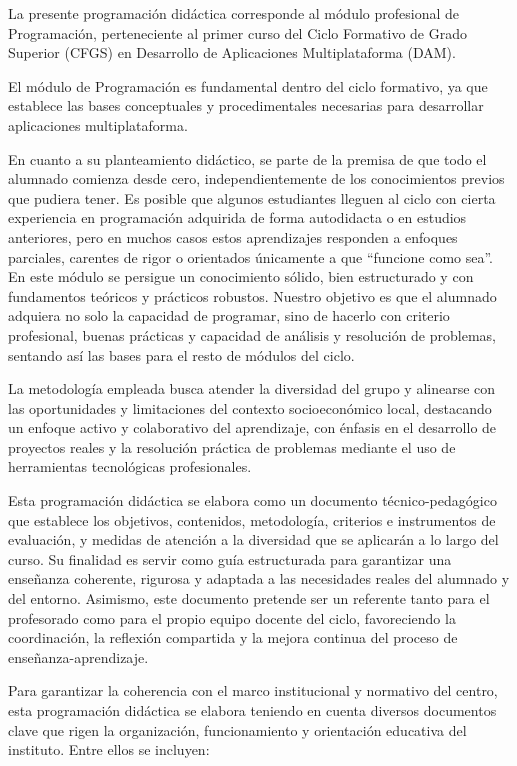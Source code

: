
La presente programación didáctica corresponde al módulo profesional de Programación, perteneciente al primer curso del Ciclo Formativo de Grado Superior (CFGS) en Desarrollo de Aplicaciones Multiplataforma (DAM).

El módulo de Programación es fundamental dentro del ciclo formativo, ya que establece las bases conceptuales y procedimentales necesarias para desarrollar aplicaciones multiplataforma. 

\label{sec:intro_00_conocimiento_previo}
En cuanto a su planteamiento didáctico, se parte de la premisa de que todo el alumnado comienza desde cero, independientemente de los conocimientos previos que pudiera tener. Es posible que algunos estudiantes lleguen al ciclo con cierta experiencia en programación adquirida de forma autodidacta o en estudios anteriores, pero en muchos casos estos aprendizajes responden a enfoques parciales, carentes de rigor o orientados únicamente a que “funcione como sea”. En este módulo se persigue un conocimiento sólido, bien estructurado y con fundamentos teóricos y prácticos robustos. Nuestro objetivo es que el alumnado adquiera no solo la capacidad de programar, sino de hacerlo con criterio profesional, buenas prácticas y capacidad de análisis y resolución de problemas, sentando así las bases para el resto de módulos del ciclo.

La metodología empleada busca atender la diversidad del grupo y alinearse con las oportunidades y limitaciones del contexto socioeconómico local, destacando un enfoque activo y colaborativo del aprendizaje, con énfasis en el desarrollo de proyectos reales y la resolución práctica de problemas mediante el uso de herramientas tecnológicas profesionales.

Esta programación didáctica se elabora como un documento técnico-pedagógico que establece los objetivos, contenidos, metodología, criterios e instrumentos de evaluación, y medidas de atención a la diversidad que se aplicarán a lo largo del curso. Su finalidad es servir como guía estructurada para garantizar una enseñanza coherente, rigurosa y adaptada a las necesidades reales del alumnado y del entorno. Asimismo, este documento pretende ser un referente tanto para el profesorado como para el propio equipo docente del ciclo, favoreciendo la coordinación, la reflexión compartida y la mejora continua del proceso de enseñanza-aprendizaje.

Para garantizar la coherencia con el marco institucional y normativo del centro, esta programación didáctica se elabora teniendo en cuenta diversos documentos clave que rigen la organización, funcionamiento y orientación educativa del instituto. Entre ellos se incluyen:

